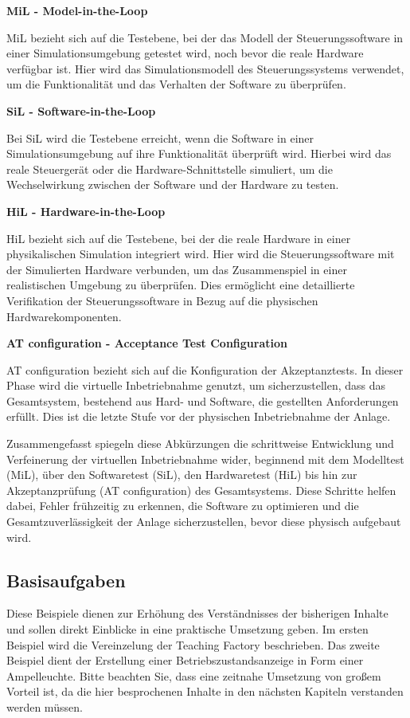\textbf{MiL - Model-in-the-Loop}

MiL bezieht sich auf die Testebene, bei der das Modell der Steuerungssoftware in einer Simulationsumgebung getestet wird, noch bevor die reale Hardware verfügbar ist. Hier wird das Simulationsmodell des Steuerungssystems verwendet, um die Funktionalität und das Verhalten der Software zu überprüfen.

\textbf{SiL - Software-in-the-Loop}

Bei SiL wird die Testebene erreicht, wenn die Software in einer Simulationsumgebung auf ihre Funktionalität überprüft wird. Hierbei wird das reale Steuergerät oder die Hardware-Schnittstelle simuliert, um die Wechselwirkung zwischen der Software und der Hardware zu testen.

\textbf{HiL - Hardware-in-the-Loop}

HiL bezieht sich auf die Testebene, bei der die reale Hardware in einer physikalischen Simulation integriert wird. Hier wird die Steuerungssoftware mit der Simulierten Hardware verbunden, um das Zusammenspiel in einer realistischen Umgebung zu überprüfen. Dies ermöglicht eine detaillierte Verifikation der Steuerungssoftware in Bezug auf die physischen Hardwarekomponenten.

\textbf{AT configuration - Acceptance Test Configuration} 

AT configuration bezieht sich auf die Konfiguration der Akzeptanztests. In dieser Phase wird die virtuelle Inbetriebnahme genutzt, um sicherzustellen, dass das Gesamtsystem, bestehend aus Hard- und Software, die gestellten Anforderungen erfüllt. Dies ist die letzte Stufe vor der physischen Inbetriebnahme der Anlage.

Zusammengefasst spiegeln diese Abkürzungen die schrittweise Entwicklung und Verfeinerung der virtuellen Inbetriebnahme wider, beginnend mit dem Modelltest (MiL), über den Softwaretest (SiL), den Hardwaretest (HiL) bis hin zur Akzeptanzprüfung (AT configuration) des Gesamtsystems. Diese Schritte helfen dabei, Fehler frühzeitig zu erkennen, die Software zu optimieren und die Gesamtzuverlässigkeit der Anlage sicherzustellen, bevor diese physisch aufgebaut wird.
  


\subsection{Basisaufgaben}

Diese Beispiele dienen zur Erhöhung des Verständnisses der bisherigen Inhalte und sollen direkt Einblicke in eine praktische Umsetzung geben. Im ersten Beispiel wird die Vereinzelung der Teaching Factory beschrieben. Das zweite Beispiel dient der Erstellung einer Betriebszustandsanzeige in Form einer Ampelleuchte. Bitte beachten Sie, dass eine zeitnahe Umsetzung von großem Vorteil ist, da die hier besprochenen Inhalte in den nächsten Kapiteln verstanden werden müssen. 


